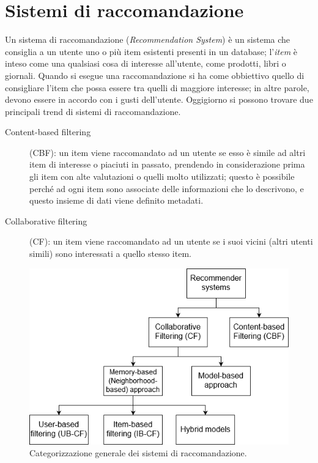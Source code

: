 \section{Sistemi di raccomandazione}
Un sistema di raccomandazione (\textit{Recommendation System}) è un sistema che consiglia a un utente uno o più item esistenti 
presenti in un database; l'\textit{item} è inteso come una qualsiasi cosa di interesse all'utente, come prodotti, libri o giornali. 
Quando si esegue una raccomandazione si ha come obbiettivo quello di consigliare l'item che possa essere tra quelli di maggiore 
interesse; in altre parole, devono essere in accordo con i gusti dell'utente.\hfill\break
Oggigiorno si possono trovare due principali trend di sistemi di raccomandazione.
\begin{description}
    \item[Content-based filtering](CBF): un item viene raccomandato ad un utente se esso è simile ad altri item di interesse o piaciuti 
    in passato, prendendo in considerazione prima gli item con alte valutazioni o quelli molto utilizzati; questo è possibile perché ad 
    ogni item sono associate delle informazioni che lo descrivono, e questo insieme di dati viene definito metadati.
    \item[Collaborative filtering](CF): un item viene raccomandato ad un utente se i suoi vicini (altri utenti simili) sono 
    interessati a quello stesso item.
\end{description}
%
\begin{figure}[ht!]
    \centering
    \includegraphics[scale=0.5]{images/recommender_systems.png}
    \caption{Categorizzazione generale dei sistemi di raccomandazione.}
    \label{fig:recommender_systems}
\end{figure}
